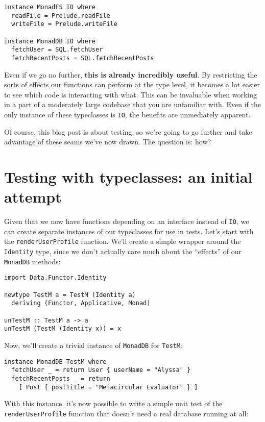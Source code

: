 \begin{verbatim}
instance MonadFS IO where
  readFile = Prelude.readFile
  writeFile = Prelude.writeFile

instance MonadDB IO where
  fetchUser = SQL.fetchUser
  fetchRecentPosts = SQL.fetchRecentPosts
\end{verbatim}
Even if we go no further, \textbf{this is already incredibly useful}. By
restricting the sorts of effects our functions can perform at the type
level, it becomes a lot easier to see which code is interacting with
what. This can be invaluable when working in a part of a moderately
large codebase that you are unfamiliar with. Even if the only instance
of these typeclasses is \texttt{IO}, the benefits are immediately
apparent.

Of course, this blog post is about testing, so we're going to go further
and take advantage of these seams we've now drawn. The question is: how?

\section{Testing with typeclasses: an initial
attempt}
\label{testing-with-typeclasses-an-initial-attempt}

Given that we now have functions depending on an interface instead of
\texttt{IO}, we can create separate instances of our typeclasses for use
in tests. Let's start with the \texttt{renderUserProfile} function.
We'll create a simple wrapper around the \texttt{Identity} type, since
we don't actually care much about the ``effects'' of our
\texttt{MonadDB} methods:

\begin{verbatim}
import Data.Functor.Identity

newtype TestM a = TestM (Identity a)
  deriving (Functor, Applicative, Monad)

unTestM :: TestM a -> a
unTestM (TestM (Identity x)) = x
\end{verbatim}
Now, we'll create a trivial instance of \texttt{MonadDB} for
\texttt{TestM}:

\begin{verbatim}
instance MonadDB TestM where
  fetchUser _ = return User { userName = "Alyssa" }
  fetchRecentPosts _ = return
    [ Post { postTitle = "Metacircular Evaluator" } ]
\end{verbatim}
With this instance, it's now possible to write a simple unit test of the
\texttt{renderUserProfile} function that doesn't need a real database
running at all:

